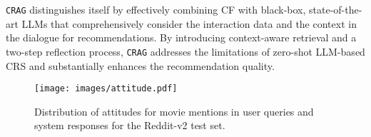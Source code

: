 \texttt{CRAG} distinguishes itself by effectively combining CF with black-box, state-of-the-art LLMs that comprehensively consider the interaction data and the context in the dialogue for recommendations. By introducing context-aware retrieval and a two-step reflection process, \texttt{CRAG} addresses the limitations of zero-shot LLM-based CRS and substantially enhances the recommendation quality.

\begin{figure}[t]
\centering
\texttt{[image: images/attitude.pdf]} 
\vspace{-3mm}    
\caption{Distribution of attitudes for movie mentions in user queries and system responses for the Reddit-v2 test set.} 
\vspace{-5mm}   
\label{fig:attitude}
\end{figure}